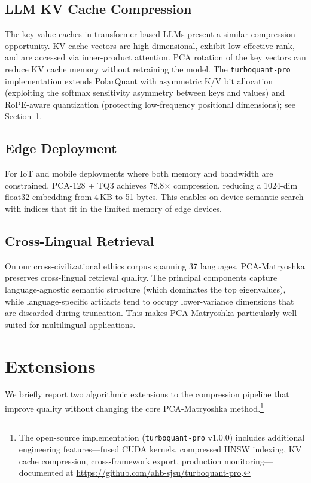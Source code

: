 \documentclass[journal]{IEEEtran}
\begin{document}
\subsection{LLM KV Cache Compression}

The key-value caches in transformer-based LLMs present a similar compression opportunity.
KV cache vectors are high-dimensional, exhibit low effective rank, and are accessed via inner-product attention.
PCA rotation of the key vectors can reduce KV cache memory without retraining the model.
The \texttt{turboquant-pro} implementation extends PolarQuant with asymmetric K/V bit allocation
(exploiting the softmax sensitivity asymmetry between keys and values) and RoPE-aware
quantization (protecting low-frequency positional dimensions); see Section~\ref{sec:update}.

\subsection{Edge Deployment}

For IoT and mobile deployments where both memory and bandwidth are constrained, PCA-128 + TQ3 achieves 78.8$\times$ compression, reducing a 1024-dim float32 embedding from 4\,KB to 51 bytes.
This enables on-device semantic search with indices that fit in the limited memory of edge devices.

\subsection{Cross-Lingual Retrieval}

On our cross-civilizational ethics corpus spanning 37 languages, PCA-Matryoshka preserves cross-lingual retrieval quality.
The principal components capture language-agnostic semantic structure (which dominates the top eigenvalues), while language-specific artifacts tend to occupy lower-variance dimensions that are discarded during truncation.
This makes PCA-Matryoshka particularly well-suited for multilingual applications.


\section{Extensions}
\label{sec:update}

We briefly report two algorithmic extensions to the compression
pipeline that improve quality without changing the core PCA-Matryoshka
method.\footnote{The open-source implementation (\texttt{turboquant-pro}
v1.0.0) includes additional engineering features---fused CUDA kernels,
compressed HNSW indexing, KV cache compression, cross-framework export,
production monitoring---documented at
\url{https://github.com/ahb-sjsu/turboquant-pro}.}
\end{document}
